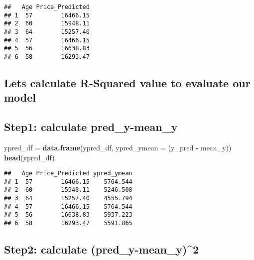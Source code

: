 \documentclass[]{article}
\newenvironment{Shaded}{\begin{snugshade}}{\end{snugshade}}
\newcommand{\DataTypeTok}[1]{\textcolor[rgb]{0.13,0.29,0.53}{#1}}
\newcommand{\DecValTok}[1]{\textcolor[rgb]{0.00,0.00,0.81}{#1}}
\newcommand{\KeywordTok}[1]{\textcolor[rgb]{0.13,0.29,0.53}{\textbf{#1}}}
\newcommand{\NormalTok}[1]{#1}
\newcommand{\OperatorTok}[1]{\textcolor[rgb]{0.81,0.36,0.00}{\textbf{#1}}}
\newcommand{\StringTok}[1]{\textcolor[rgb]{0.31,0.60,0.02}{#1}}
\begin{document}
\begin{verbatim}
##   Age Price_Predicted
## 1  57        16466.15
## 2  60        15948.11
## 3  64        15257.40
## 4  57        16466.15
## 5  56        16638.83
## 6  58        16293.47
\end{verbatim}

\hypertarget{lets-calculate-r-squared-value-to-evaluate-our-model}{%
\subsection{Lets calculate R-Squared value to evaluate our
model}\label{lets-calculate-r-squared-value-to-evaluate-our-model}}

\hypertarget{step1-calculate-pred_y-mean_y}{%
\subsection{Step1: calculate
pred\_y-mean\_y}\label{step1-calculate-pred_y-mean_y}}

\begin{Shaded}
\begin{Highlighting}[]
\NormalTok{ypred_df =}\StringTok{ }\KeywordTok{data.frame}\NormalTok{(ypred_df, }\DataTypeTok{ypred_ymean =}\NormalTok{ (y_pred }\OperatorTok{-}\StringTok{ }\NormalTok{mean_y))}
\KeywordTok{head}\NormalTok{(ypred_df)}
\end{Highlighting}
\end{Shaded}

\begin{verbatim}
##   Age Price_Predicted ypred_ymean
## 1  57        16466.15    5764.544
## 2  60        15948.11    5246.508
## 3  64        15257.40    4555.794
## 4  57        16466.15    5764.544
## 5  56        16638.83    5937.223
## 6  58        16293.47    5591.865
\end{verbatim}

\hypertarget{step2-calculate-pred_y-mean_y2}{%
\subsection{Step2: calculate
(pred\_y-mean\_y)\^{}2}\label{step2-calculate-pred_y-mean_y2}}

\begin{Shaded}
\end{Shaded}
\end{document}
